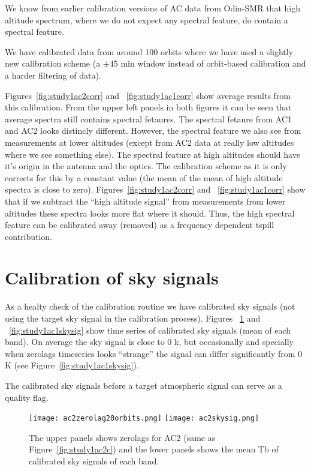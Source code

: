 We know from earlier calibration versions of AC data from Odin-SMR
that high altitude spectrum, where we do not expect any spectral
feature, do contain a spectral feature. 

We have calibrated data from around 100 orbits where we have used
a slightly new calibration scheme (a \(\pm\)45 min window instead
of orbit-based calibration and a harder filtering of data). 
 
Figures~\ref{fig:study1ac2corr} and ~\ref{fig:study1ac1corr} show average
results from this calibration. From the upper left panels in
both figures it can be seen that average spectra still contains
spectral fetaures. The spectral fetaure from AC1 and AC2 looks
distincly different.
However, the spectral feature we also see from measurements
at lower altitudes (except from AC2 data at really low altitudes
where we see something else). The spectral feature at high altitudes
should have it's
origin in the antenna and the optics. The calibration scheme as it is
only corrects for this by a constant value (the mean of the mean
of high altitude spectra is close to zero).
Figures~\ref{fig:study1ac2corr} and ~\ref{fig:study1ac1corr} show that if we
subtract the ``high altitude signal'' from measurements from lower
altitudes these spectra looks more flat where it should.
Thus, the high spectral feature can be calibrated away (removed) 
as a frequency dependent tspill contribution.  

\section{Calibration of sky signals}
As a healty check of the calibration routine we have calibrated 
sky signals (not using the target sky signal in the calibration
process). Figures ~\ref{fig:study1ac2skysig} and ~\ref{fig:study1ac1skysig}
show time series of calibrated sky signals (mean of each band). 
On average the sky signal is close to 0 k, but occasionally
and specially
when zerolags timeseries looks ``strange'' the signal
can differ significantly from 0 K (see Figure~\ref{fig:study1ac1skysig}).

The calibrated sky signals before a target atmospheric signal 
can serve as a quality flag.


\begin{figure}[!t]
\centering
\texttt{[image: ac2zerolag20orbits.png]}
\texttt{[image: ac2skysig.png]}
\caption{The upper panels shows zerolags for AC2 (same as Figure~\ref{fig:study1ac2c}) and the lower panels shows the mean Tb of calibrated sky signals of each band.
}
\label{fig:study1ac2skysig}
\end{figure} 

